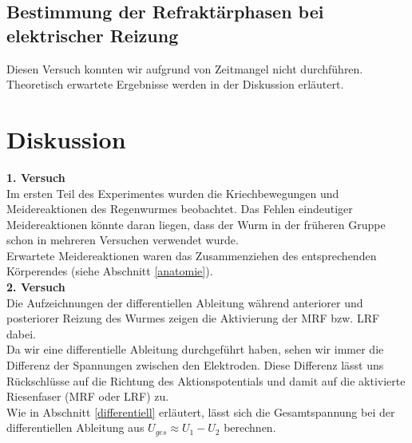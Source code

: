 \documentclass[11pt]{article}
\begin{document}
\subsection{Bestimmung der Refraktärphasen bei elektrischer Reizung}
Diesen Versuch konnten wir aufgrund von Zeitmangel nicht durchführen. Theoretisch erwartete Ergebnisse werden in der Diskussion erläutert.

\section{Diskussion}

\textbf{1. Versuch} \\
Im ersten Teil des Experimentes wurden die Kriechbewegungen und Meidereaktionen des Regenwurmes beobachtet. 
Das Fehlen eindeutiger Meidereaktionen könnte daran liegen, dass der Wurm in der früheren Gruppe schon in mehreren Versuchen verwendet wurde. \\
Erwartete Meidereaktionen waren das Zusammenziehen des entsprechenden Körperendes (siehe Abschnitt \ref{anatomie}). \\

\textbf{2. Versuch}\\
Die Aufzeichnungen der differentiellen Ableitung während anteriorer und posteriorer Reizung des Wurmes zeigen die Aktivierung der MRF bzw. LRF dabei. \\
Da wir eine differentielle Ableitung durchgeführt haben, sehen wir immer die Differenz der Spannungen zwischen den Elektroden. Diese Differenz lässt uns Rückschlüsse auf die Richtung des Aktionspotentials und damit auf die aktivierte Riesenfaser (MRF oder LRF) zu. \\
Wie in Abschnitt \ref{differentiell} erläutert, lässt sich die Gesamtspannung bei der differentiellen Ableitung aus $U_{ges} \approx U_1 - U_2$ berechnen. \\
\end{document}
